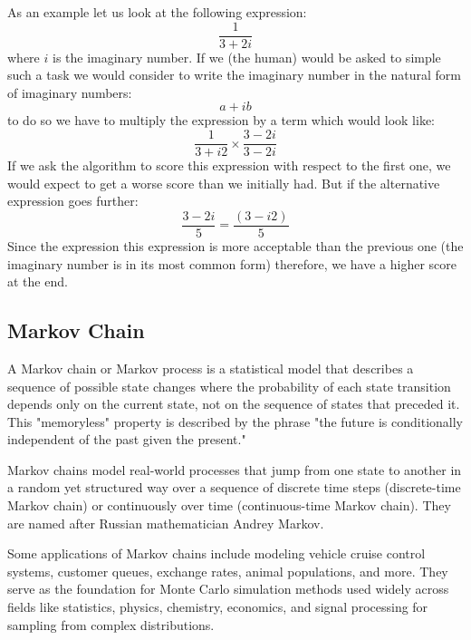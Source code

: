 \documentclass[9pt,a4paper,twocolumn]{article}
\begin{document}
            As an example let us look at the following expression:
            \begin{equation}
                \frac{1}{3 + 2 i}
            \end{equation}
            where $i$ is the imaginary number. If we (the human) would be asked to simple such a task we would consider to write the imaginary number in the natural form of imaginary numbers:
            \begin{equation}
                a + ib
            \end{equation}
            to do so we have to multiply the expression by a term which would look like:
            \begin{equation}
                \frac{1}{3 + i 2}\times \frac{3 - 2 i}{3 - 2 i}
            \end{equation}
            If we ask the algorithm to score this expression with respect to the first one, we would expect to get a worse score than we initially had. But if the alternative expression goes further:
            \begin{equation}
                \frac{3 - 2i}{5} = \frac{\left(3 - i2\right)}5
            \end{equation}
            Since the expression this expression is more acceptable than the previous one (the imaginary number is in its most common form) therefore, we have a higher score at the end.

            \subsection{Markov Chain}
                A Markov chain or Markov process is a statistical model that describes a sequence of possible state changes where the probability of each state transition depends only on the current state, not on the sequence of states that preceded it. This "memoryless" property is described by the phrase "the future is conditionally independent of the past given the present."

                Markov chains model real-world processes that jump from one state to another in a random yet structured way over a sequence of discrete time steps (discrete-time Markov chain) or continuously over time (continuous-time Markov chain). They are named after Russian mathematician Andrey Markov.
            
                Some applications of Markov chains include modeling vehicle cruise control systems, customer queues, exchange rates, animal populations, and more. They serve as the foundation for Monte Carlo simulation methods used widely across fields like statistics, physics, chemistry, economics, and signal processing for sampling from complex distributions.
\end{document}
